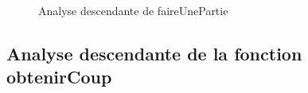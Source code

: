 \documentclass{article}
\begin{document}
\begin{figure}[H]
    \caption{Analyse descendante de faireUnePartie}
    \label{un-identifiant1}
\end{figure}

\subsection{Analyse descendante de la fonction obtenirCoup}
\end{document}
